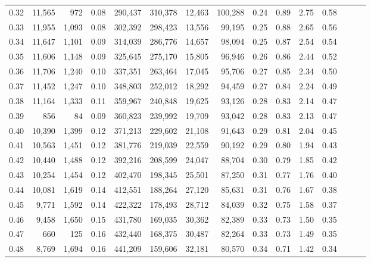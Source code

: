 \begin{tabular}{rrrrrrrrrrrrrrr}
0.32 &  11,565 &    972 &  0.08 &  290,437 &  310,378 &   12,463 &  100,288 &  0.24 &  0.89 &  2.75 &      0.58 \\
0.33 &  11,955 &  1,093 &  0.08 &  302,392 &  298,423 &   13,556 &   99,195 &  0.25 &  0.88 &  2.65 &      0.56 \\
0.34 &  11,647 &  1,101 &  0.09 &  314,039 &  286,776 &   14,657 &   98,094 &  0.25 &  0.87 &  2.54 &      0.54 \\
0.35 &  11,606 &  1,148 &  0.09 &  325,645 &  275,170 &   15,805 &   96,946 &  0.26 &  0.86 &  2.44 &      0.52 \\
0.36 &  11,706 &  1,240 &  0.10 &  337,351 &  263,464 &   17,045 &   95,706 &  0.27 &  0.85 &  2.34 &      0.50 \\
0.37 &  11,452 &  1,247 &  0.10 &  348,803 &  252,012 &   18,292 &   94,459 &  0.27 &  0.84 &  2.24 &      0.49 \\
0.38 &  11,164 &  1,333 &  0.11 &  359,967 &  240,848 &   19,625 &   93,126 &  0.28 &  0.83 &  2.14 &      0.47 \\
0.39 &     856 &     84 &  0.09 &  360,823 &  239,992 &   19,709 &   93,042 &  0.28 &  0.83 &  2.13 &      0.47 \\
0.40 &  10,390 &  1,399 &  0.12 &  371,213 &  229,602 &   21,108 &   91,643 &  0.29 &  0.81 &  2.04 &      0.45 \\
0.41 &  10,563 &  1,451 &  0.12 &  381,776 &  219,039 &   22,559 &   90,192 &  0.29 &  0.80 &  1.94 &      0.43 \\
0.42 &  10,440 &  1,488 &  0.12 &  392,216 &  208,599 &   24,047 &   88,704 &  0.30 &  0.79 &  1.85 &      0.42 \\
0.43 &  10,254 &  1,454 &  0.12 &  402,470 &  198,345 &   25,501 &   87,250 &  0.31 &  0.77 &  1.76 &      0.40 \\
0.44 &  10,081 &  1,619 &  0.14 &  412,551 &  188,264 &   27,120 &   85,631 &  0.31 &  0.76 &  1.67 &      0.38 \\
0.45 &   9,771 &  1,592 &  0.14 &  422,322 &  178,493 &   28,712 &   84,039 &  0.32 &  0.75 &  1.58 &      0.37 \\
0.46 &   9,458 &  1,650 &  0.15 &  431,780 &  169,035 &   30,362 &   82,389 &  0.33 &  0.73 &  1.50 &      0.35 \\
0.47 &     660 &    125 &  0.16 &  432,440 &  168,375 &   30,487 &   82,264 &  0.33 &  0.73 &  1.49 &      0.35 \\
0.48 &   8,769 &  1,694 &  0.16 &  441,209 &  159,606 &   32,181 &   80,570 &  0.34 &  0.71 &  1.42 &      0.34 \\

\end{tabular}
